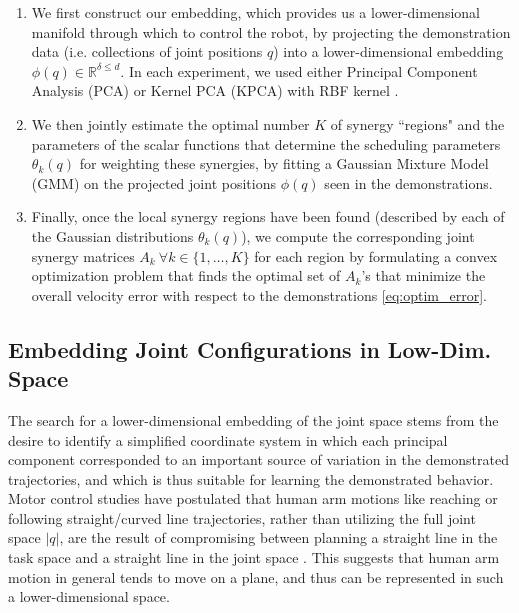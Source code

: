 \documentclass[letterpaper, 10 pt, conference,fleqn]{ieeeconf}
\begin{document}
\begin{enumerate}
\item We first construct our embedding, which provides us a lower-dimensional manifold through which to control the robot, by projecting the demonstration data (i.e. collections of joint positions $q$) into a lower-dimensional embedding $\phi(q)\in \mathbb{R}^{\delta\leq d}$. In each experiment, we used either Principal Component Analysis (PCA) \cite{jolliffe1986pca} or Kernel PCA (KPCA) with RBF kernel \cite{scholkopf1997kernel}.

\item We then jointly estimate the optimal number $K$ of synergy ``regions" and the parameters of the scalar functions that determine the scheduling parameters $\theta_k(q)$ for weighting these synergies, by fitting a Gaussian Mixture Model (GMM) on the projected joint positions $\phi(q)$ seen in the demonstrations.

\item Finally, once the local synergy regions have been found (described by each of the Gaussian distributions $\theta_k(q)$), we compute the corresponding joint synergy matrices $A_k~\forall k\in\{1,\dots,K\}$ for each region by formulating a convex optimization problem that finds the optimal set of $A_k$'s that minimize the overall velocity error with respect to the demonstrations \eqref{eq:optim_error}.
\end{enumerate}




\subsection{Embedding Joint Configurations in Low-Dim. Space}
The search for a lower-dimensional embedding of the joint space stems from the desire to identify a simplified coordinate system in which each principal component corresponded to an important source of variation in the demonstrated trajectories, and which is thus suitable for learning the demonstrated behavior. Motor control studies have postulated that human arm motions like reaching or following straight/curved line trajectories, rather than utilizing the full joint space $|q|$, are the result of compromising between planning a straight line in the task space and a straight line in the joint space \cite{Cruse1987humanarm,Okadome1999arm}. This suggests that human arm motion in general tends to move on a plane, and thus can be represented in such a lower-dimensional space. 
\end{document}
